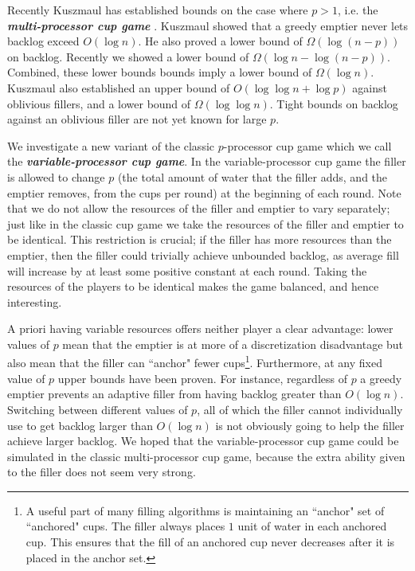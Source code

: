 \documentclass[twocolumn]{article}[10pt]
\newcommand{\defn}[1]{{\textit{\textbf{\boldmath #1}}}\xspace}
\renewcommand{\paragraph}[1]{\vspace{0.09in}\noindent{\bf \boldmath #1.}}
\begin{document}
Recently Kuszmaul has established bounds on the case where $p>1$, i.e. the
\defn{multi-processor cup game} \cite{wku20}. Kuszmaul showed that a greedy
emptier never lets backlog exceed $O(\log n)$. He also proved a lower bound of
$\Omega(\log (n-p))$ on backlog. Recently we showed a lower bound of
$\Omega(\log n - \log (n-p))$. Combined, these lower bounds bounds imply a
lower bound of $\Omega(\log n)$. Kuszmaul also established an upper bound of
$O(\log\log n + \log p)$ against oblivious fillers, and a lower bound of
$\Omega(\log\log n)$. Tight bounds on backlog against an oblivious
filler are not yet known for large $p$.

\paragraph{Our Variant}
We investigate a new variant of the classic $p$-processor cup game which we call
the \defn{variable-processor cup game}. In the variable-processor cup game the
filler is allowed to change $p$ (the total amount of water that the filler
adds, and the emptier removes, from the cups per round) at the beginning of
each round. Note that we do not allow the resources of the filler and emptier
to vary separately; just like in the classic cup game we take the resources of
the filler and emptier to be identical.
This restriction is crucial; if
the filler has more resources than the emptier, then
the filler could trivially achieve unbounded backlog, as average fill will
increase by at least some positive constant at each round.
Taking the resources of the players to be identical makes the game balanced,
and hence interesting.

A priori having variable resources offers neither player a clear advantage:
lower values of $p$ mean that the emptier is at more of a discretization
disadvantage but also mean that the filler can ``anchor" fewer cups\footnote{A
useful part of many filling algorithms is maintaining an ``anchor" set of
``anchored" cups. The filler always places $1$ unit of water in each anchored
cup. This ensures that the fill of an anchored cup never decreases after it is
placed in the anchor set.}. Furthermore, at any fixed value of $p$ upper bounds
have been proven. For instance, regardless of $p$ a greedy emptier prevents an
adaptive filler from having backlog greater than $O(\log n)$. Switching between
different values of $p$, all of which the filler cannot individually use to get
backlog larger than $O(\log n)$ is not obviously going to help the filler achieve larger backlog.
We hoped that the variable-processor cup game could
be simulated in the classic multi-processor cup game, because the extra
ability given to the filler does not seem very strong. 
\end{document}
